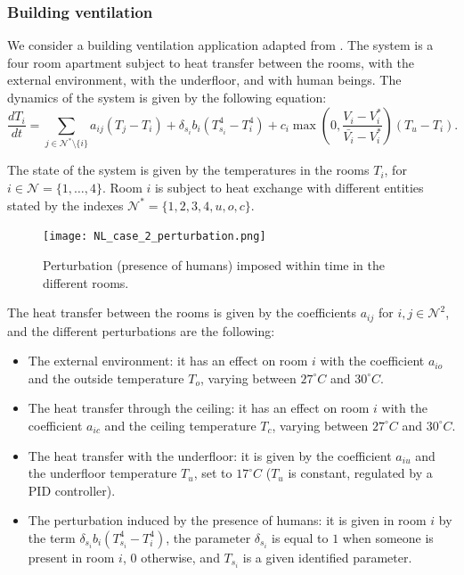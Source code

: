 \subsubsection{Building ventilation}
%
We consider a building ventilation application adapted from
\cite{meyer:tel-01232640}.  The system is a four room apartment
subject to heat transfer between the rooms, with the external
environment, with the underfloor, and with human beings.  The dynamics
of the system is given by the following equation:
\begin{displaymath}
 \frac{d T_i}{dt} = \sum_{j \in \mathcal{N}^\text{*}\setminus \{i\}} a_{ij} (T_j -
 T_i) + \delta_{s_i} b_i (T_{s_i}^4 - T_i ^4 ) + c_i
 \max\left(0,\frac{V_i - V_i^\text{*}}{\bar{ V_i} -
   V_i^{\text{*}}}\right)(T_u - T_i).
\end{displaymath}

The state of the system is given by the temperatures in the rooms
$T_i$, for $i \in \mathcal{N} = \{ 1 , \dots , 4 \}$.  Room $i$ is
subject to heat exchange with different entities stated by the indexes
$\mathcal{N}^\text{*} = \{1,2,3,4,u,o,c \}$.

\begin{figure}[t]
  \centering
  \texttt{[image: NL\_case\_2\_perturbation.png]}
  \caption{Perturbation (presence of humans) imposed within time in the
    different rooms.}
  \label{fig:NL_2_perturbation}
\end{figure}


The heat transfer between the rooms is given by the coefficients
$a_{ij}$ for $i,j \in \mathcal{N}^2$, and the different perturbations
are the following:
\begin{itemize}
 \item The external environment: it has an effect on room $i$ with the
   coefficient $a_{io}$ and the outside temperature $T_o$, varying
   between $27^\circ C$ and $30^\circ C$.
  \item The heat transfer through the ceiling: it has an effect on
    room $i$ with the coefficient $a_{ic}$ and the ceiling temperature
    $T_c$, varying between $27^\circ C$ and $30^\circ C$.
  \item The heat transfer with the underfloor: it is given by the
    coefficient $a_{iu}$ and the underfloor temperature $T_u$, set to
    $17^\circ C$ ($T_u$ is constant, regulated by a PID controller).
  \item The perturbation induced by the presence of humans: it is
    given in room $i$ by the term $\delta_{s_i} b_i (T_{s_i}^4 - T_i
    ^4 )$, the parameter $\delta_{s_i}$ is equal to $1$ when someone
    is present in room $i$, $0$ otherwise, and $T_{s_i}$ is a given
    identified parameter.
\end{itemize}

